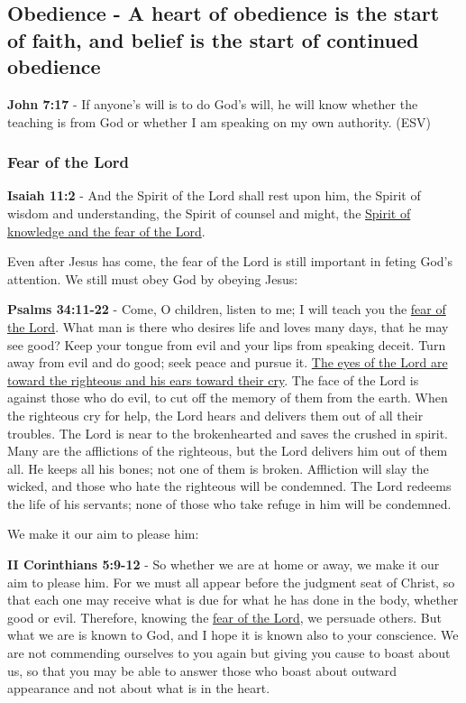 \documentclass[11pt]{article}
\begin{document}
\subsection{Obedience - A heart of obedience is the start of faith, and belief is the start of continued obedience}
\label{sec:org9b157f2}
\textbf{John 7:17} -  If anyone's will is to do God's will, he will know whether the teaching is from God or whether I am speaking on my own authority. (ESV)

\subsubsection{Fear of the Lord}
\label{sec:orgd6e0f43}
\textbf{Isaiah 11:2} - And the Spirit of the Lord shall rest upon him, the Spirit of wisdom and understanding, the Spirit of counsel and might, the \uline{Spirit of knowledge and the fear of the Lord}.

Even after Jesus has come, the fear of the Lord is still important in feting God's attention. We still must obey God by obeying Jesus:

\textbf{Psalms 34:11-22} - Come, O children, listen to me; I will teach you the \uline{fear of the Lord}. What man is there who desires life and loves many days, that he may see good? Keep your tongue from evil and your lips from speaking deceit. Turn away from evil and do good; seek peace and pursue it. \uline{The eyes of the Lord are toward the righteous and his ears toward their cry}. The face of the Lord is against those who do evil, to cut off the memory of them from the earth. When the righteous cry for help, the Lord hears and delivers them out of all their troubles. The Lord is near to the brokenhearted and saves the crushed in spirit. Many are the afflictions of the righteous, but the Lord delivers him out of them all. He keeps all his bones; not one of them is broken. Affliction will slay the wicked, and those who hate the righteous will be condemned. The Lord redeems the life of his servants; none of those who take refuge in him will be condemned.

We make it our aim to please him:

\textbf{II Corinthians 5:9-12} - So whether we are at home or away, we make it our aim to please him. For we must all appear before the judgment seat of Christ, so that each one may receive what is due for what he has done in the body, whether good or evil. Therefore, knowing the \uline{fear of the Lord}, we persuade others. But what we are is known to God, and I hope it is known also to your conscience. We are not commending ourselves to you again but giving you cause to boast about us, so that you may be able to answer those who boast about outward appearance and not about what is in the heart.
\end{document}
